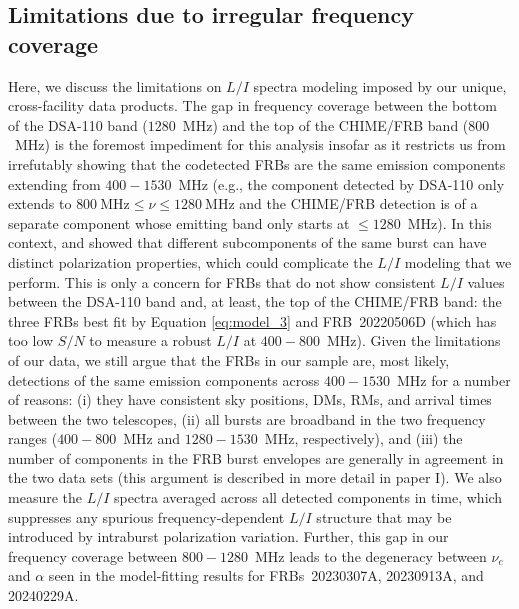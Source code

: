 \documentclass[twocolumn, linenumbers]{aastex701}
\begin{document}
\subsection{Limitations due to irregular frequency coverage} \label{sec:discussion_freq_limitations}
Here, we discuss the limitations on $L/I$ spectra modeling imposed by our unique, cross-facility data products. The gap in frequency coverage between the bottom of the DSA-110 band ($1280$~MHz) and the top of the CHIME/FRB band ($800$~MHz) is the foremost impediment for this analysis insofar as it restricts us from irrefutably showing that the codetected FRBs are the same emission components extending from $400-1530$~MHz (e.g., the component detected by DSA-110 only extends to $800~\mathrm{MHz}\leq \nu \leq 1280~\mathrm{MHz}$ and the CHIME/FRB detection is of a separate component whose emitting band only starts at $\leq 1280$~MHz). In this context, \cite{2020ApJ...891L..38C} and \cite{2024ApJ...968...50P} showed that different subcomponents of the same burst can have distinct polarization properties, which could complicate the $L/I$ modeling that we perform. This is only a concern for FRBs that do not show consistent $L/I$ values between the DSA-110 band and, at least, the top of the CHIME/FRB band: the three FRBs best fit by Equation \ref{eq:model_3} and FRB~20220506D (which has too low $S/N$ to measure a robust $L/I$ at $400-800$~MHz). Given the limitations of our data, we still argue that the FRBs in our sample are, most likely, detections of the same emission components across $400-1530$~MHz for a number of reasons: (i) they have consistent sky positions, DMs, RMs, and arrival times between the two telescopes, (ii) all bursts are broadband in the two frequency ranges ($400-800$~MHz and $1280-1530$~MHz, respectively), and (iii) the number of components in the FRB burst envelopes are generally in agreement in the two data sets (this argument is described in more detail in paper I). We also measure the $L/I$ spectra averaged across all detected components in time, which suppresses any spurious frequency-dependent $L/I$ structure that may be introduced by intraburst polarization variation. Further, this gap in our frequency coverage between $800-1280$~MHz leads to the degeneracy between $\nu_c$ and $\alpha$ seen in the model-fitting results for FRBs~20230307A, 20230913A, and 20240229A.
\end{document}
